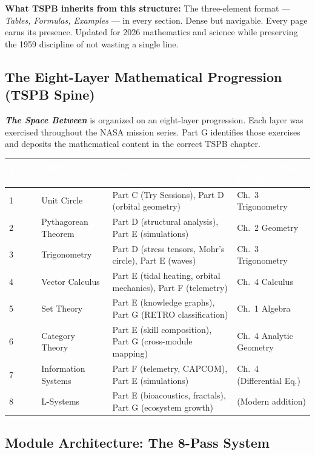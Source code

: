 \documentclass[11pt,letterpaper]{article}
\newcommand{\tspb}{\textbf{\textit{The Space Between}}}
\newcommand{\tableheader}[1]{\textbf{\sffamily\textcolor{white}{#1}}}
\begin{document}
\textbf{What TSPB inherits from this structure:} The three-element format --- \textit{Tables, Formulas, Examples} --- in every section. Dense but navigable. Every page earns its presence. Updated for 2026 mathematics and science while preserving the 1959 discipline of not wasting a single line.

\subsection{The Eight-Layer Mathematical Progression (TSPB Spine)}

\tspb{} is organized on an eight-layer progression. Each layer was exercised throughout the NASA mission series. Part G identifies those exercises and deposits the mathematical content in the correct TSPB chapter.

\begin{center}
\begin{tabularx}{\textwidth}{C{0.8cm}L{3.5cm}L{3.5cm}X}
\toprule
{}
\tableheader{Layer} & \tableheader{TSPB Chapter} & \tableheader{Exercised in Series} & \tableheader{McNeese-Hoag Parallel} \\
 & Unit Circle & Part C (Try Sessions), Part D (orbital geometry) & Ch.\ 3 Trigonometry \\
2 & Pythagorean Theorem & Part D (structural analysis), Part E (simulations) & Ch.\ 2 Geometry \\
3 & Trigonometry & Part D (stress tensors, Mohr's circle), Part E (waves) & Ch.\ 3 Trigonometry \\
4 & Vector Calculus & Part E (tidal heating, orbital mechanics), Part F (telemetry) & Ch.\ 4 Calculus \\
5 & Set Theory & Part E (knowledge graphs), Part G (RETRO classification) & Ch.\ 1 Algebra \\
6 & Category Theory & Part E (skill composition), Part G (cross-module mapping) & Ch.\ 4 Analytic Geometry \\
7 & Information Systems & Part F (telemetry, CAPCOM), Part E (simulations) & Ch.\ 4 (Differential Eq.) \\
8 & L-Systems & Part E (bioacoustics, fractals), Part G (ecosystem growth) & (Modern addition) \\
\bottomrule
\end{tabularx}
\end{center}

\subsection{Module Architecture: The 8-Pass System}
\end{document}
